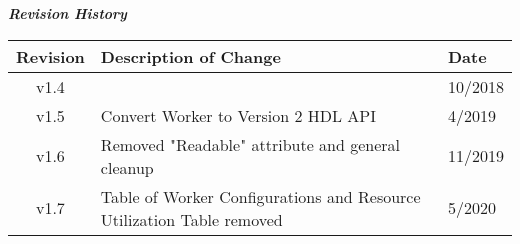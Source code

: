 \iffalse
This file is protected by Copyright. Please refer to the COPYRIGHT file
distributed with this source distribution.

This file is part of OpenCPI <http://www.opencpi.org>

OpenCPI is free software: you can redistribute it and/or modify it under the
terms of the GNU Lesser General Public License as published by the Free Software
Foundation, either version 3 of the License, or (at your option) any later
version.

OpenCPI is distributed in the hope that it will be useful, but WITHOUT ANY
WARRANTY; without even the implied warranty of MERCHANTABILITY or FITNESS FOR A
PARTICULAR PURPOSE. See the GNU Lesser General Public License for more details.

You should have received a copy of the GNU Lesser General Public License along
with this program. If not, see <http://www.gnu.org/licenses/>.
\fi

\def\comp{dc\_{}offset\_{}filter}
\edef\ecomp{dc_offset_filter}
\def\Comp{DC Offset Filter}
\def\docTitle{\Comp{} Component Data Sheet}
\def\snippetpath{../../../../../../doc/av/tex/snippets}

\graphicspath{{figures/}}


\maketitle
\thispagestyle{empty}
\newpage

\begin{center}
	\textit{\textbf{Revision History}}
	\begin{table}[H]
	\label{table:revisions} %
		\begin{tabularx}{\textwidth}{|c|X|l|}
		\hline
		\rowcolor{blue}
		\textbf{Revision} & \textbf{Description of Change} & \textbf{Date} \\
		\hline
		v1.4 & & 10/2018 \\
		\hline
		v1.5 & Convert Worker to Version 2 HDL API & 4/2019\\
		\hline
		v1.6 & Removed "Readable" attribute and general cleanup & 11/2019\\
		\hline
	    v1.7 & Table of Worker Configurations and Resource Utilization Table removed & 5/2020 \\
			\hline
		\end{tabularx}
	\end{table}
\end{center}
\newpage

